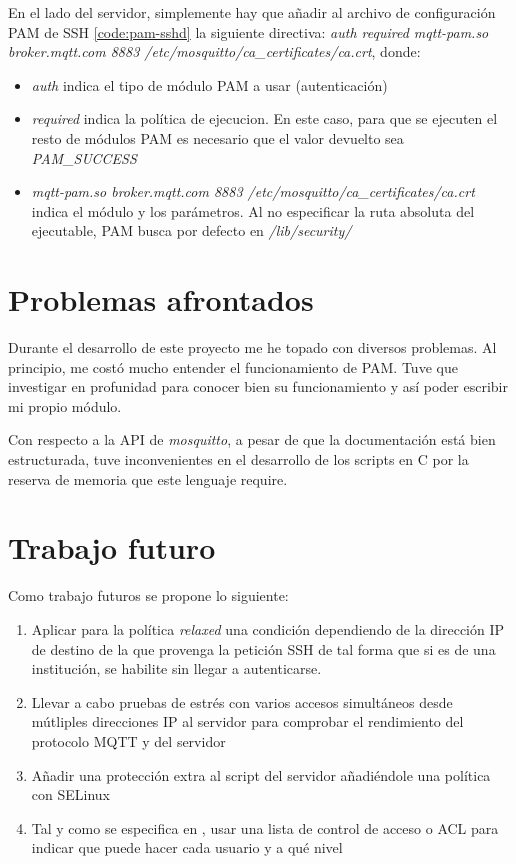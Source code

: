 En el lado del servidor, simplemente hay que añadir al archivo de configuración PAM de SSH \ref{code:pam-sshd} la siguiente 
directiva: \textit{auth required mqtt-pam.so broker.mqtt.com 8883 /etc/mosquitto/ca\_certificates/ca.crt}, donde:

\begin{itemize}
    \item \textit{auth} indica el tipo de módulo PAM a usar (autenticación)
    \item \textit{required} indica la política de ejecucion. En este caso, para que se ejecuten el resto de módulos PAM es 
    necesario que el valor devuelto sea \textit{PAM\_SUCCESS}
    \item \textit{mqtt-pam.so broker.mqtt.com 8883 /etc/mosquitto/ca\_certificates/ca.crt} indica el módulo y los parámetros. 
    Al no especificar la ruta absoluta del ejecutable, PAM busca por defecto en \textit{/lib/security/}
\end{itemize}

\section{Problemas afrontados}

Durante el desarrollo de este proyecto me he topado con diversos problemas. Al principio, me costó mucho entender el funcionamiento
de PAM. Tuve que investigar en profunidad para conocer bien su funcionamiento y así poder escribir mi propio módulo. 

Con respecto a la API de \textit{mosquitto}, a pesar de que la documentación \cite{mosquittoconf_2021} está bien estructurada,
tuve inconvenientes en el desarrollo de los scripts en C por la reserva de memoria que este lenguaje require.

\section{Trabajo futuro}

Como trabajo futuros se propone lo siguiente:

\begin{enumerate}
    \item Aplicar para la política \textit{relaxed} una condición dependiendo de la dirección IP de destino de la que provenga 
    la petición SSH de tal forma que si es de una institución, se habilite sin llegar a autenticarse.
    \item Llevar a cabo pruebas de estrés con varios accesos simultáneos desde mútliples direcciones IP al servidor para 
    comprobar el rendimiento del protocolo MQTT y del servidor
    \item Añadir una protección extra al script del servidor añadiéndole una política con SELinux
    \item Tal y como  se especifica en \cite{multipauthpaper}, usar una lista de control de acceso o ACL para indicar que puede
    hacer cada usuario y a qué nivel
\end{enumerate}